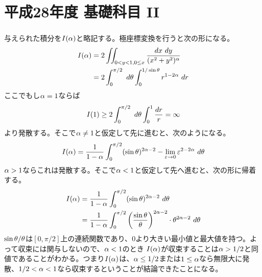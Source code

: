 \section{平成28年度 基礎科目 II}

\subsubsection{} %
\begin{sol}
与えられた積分を$I({\alpha})$と略記する。極座標変換を行うと次の形になる。
\begin{align*}
  I({\alpha}) &= 2 \iint_{0 < y < 1, 0 \leq x} \frac{dx \ dy}{(x^2 + y^2)^{{\alpha}} } \\
  &= 2 \int_0^{\pi /2} \ d{\theta} \int_0^{1/ \sin {\theta}} r^{1 - 2 {\alpha}} \ dr
\end{align*}
ここでもし${\alpha} = 1$ならば
\[
I(1) \geq 2 \int_0^{\pi /2} \ d{\theta} \int_0^1 \frac{dr}{r} = \infty
\]
より発散する。そこで${\alpha} \neq 1$と仮定して先に進むと、次のようになる。
\[
I({\alpha}) = \frac{1}{1- {\alpha}} \int_0^{\pi /2} (\sin {\theta})^{2{\alpha} - 2} - \lim_{{\varepsilon} \to 0} {\varepsilon}^{2 - 2{\alpha}} \ d{\theta}
\]
${\alpha} > 1$ならこれは発散する。そこで${\alpha} < 1$と仮定して先へ進むと、次の形に帰着する。
\begin{align*}
  I({\alpha}) &=  \frac{1}{1- {\alpha}} \int_0^{\pi /2}  (\sin {\theta})^{2{\alpha} - 2} \ d{\theta} \\
  &= \frac{1}{1- {\alpha}} \int_0^{\pi /2}  \left( \frac{\sin {\theta}}{{\theta}} \right)^{2{\alpha} - 2} \cdot {\theta}^{2{\alpha} - 2} \ d{\theta} \\
\end{align*}
$\sin {\theta} / {\theta}$は$[0, \pi/2]$上の連続関数であり、$0$より大きい最小値と最大値を持つ。よって収束には関与しないので、${\alpha} < 1$のとき
$I({\alpha})$が収束することは${\alpha} > 1/2$と同値であることがわかる。つまり$I({\alpha})$は、${\alpha} \leq 1/2$または$1 \leq {\alpha}$なら無限大に発散、$1/2 < {\alpha} < 1$なら収束するということが結論できたことになる。
\end{sol}

\newpage


